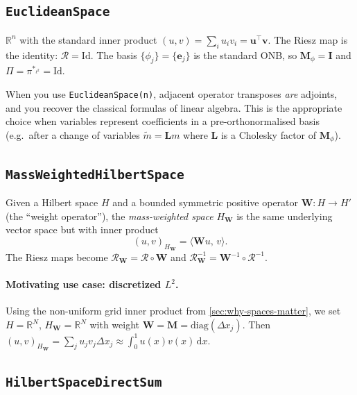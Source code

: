 \documentclass[11pt,twoside,openright]{book}
\theoremstyle{plain}
\theoremstyle{definition}
\theoremstyle{remark}
\newcommand{\Riesz}{\mathcal{R}}
\begin{document}
\subsection{\texttt{EuclideanSpace}}
\label{ssec:euclidean-space}

$\mathbb{R}^n$ with the standard inner product $(u, v) = \sum_i u_i v_i =
\mathbf{u}^\top \mathbf{v}$. The Riesz map is the identity: $\Riesz = \mathrm{Id}$.
The basis $\{\phi_j\} = \{\mathbf{e}_j\}$ is the standard ONB, so $\mathbf{M}_\phi
= \mathbf{I}$ and $\Pi = \pi^{*_{\ell^2}} = \mathrm{Id}$.

When you use \texttt{EuclideanSpace(n)}, adjacent operator transposes
\emph{are} adjoints, and you recover the classical formulas of linear
algebra. This is the appropriate choice when variables represent
coefficients in a pre-orthonormalised basis (e.g.\ after a change of
variables $\tilde{m} = \mathbf{L} m$ where $\mathbf{L}$ is a Cholesky
factor of $\mathbf{M}_\phi$).

\subsection{\texttt{MassWeightedHilbertSpace}}
\label{ssec:mass-weighted}

Given a Hilbert space $H$ and a bounded symmetric positive operator
$\mathbf{W} : H \to H'$ (the ``weight operator''), the
\emph{mass-weighted space} $H_{\mathbf{W}}$ is the same underlying vector
space but with inner product
\begin{equation}
  \label{eq:mass-weighted-ip}
  (u, v)_{H_{\mathbf{W}}} = \langle \mathbf{W} u,\, v \rangle.
\end{equation}
The Riesz maps become $\Riesz_{\mathbf{W}} = \Riesz \circ \mathbf{W}$ and
$\Riesz_{\mathbf{W}}^{-1} = \mathbf{W}^{-1} \circ \Riesz^{-1}$.

\paragraph{Motivating use case: discretized $L^2$.}
Using the non-uniform grid inner product from
\cref{sec:why-spaces-matter}, we set $H = \mathbb{R}^N$,
$H_{\mathbf{W}} = \mathbb{R}^N$ with weight $\mathbf{W} = \mathbf{M} =
\mathrm{diag}(\Delta x_j)$. Then $(u, v)_{H_{\mathbf{W}}} = \sum_j
u_j v_j \Delta x_j \approx \int_0^1 u(x) v(x)\,\mathrm{d}x$.

\subsection{\texttt{HilbertSpaceDirectSum}}
\label{ssec:direct-sum-space}
\end{document}
